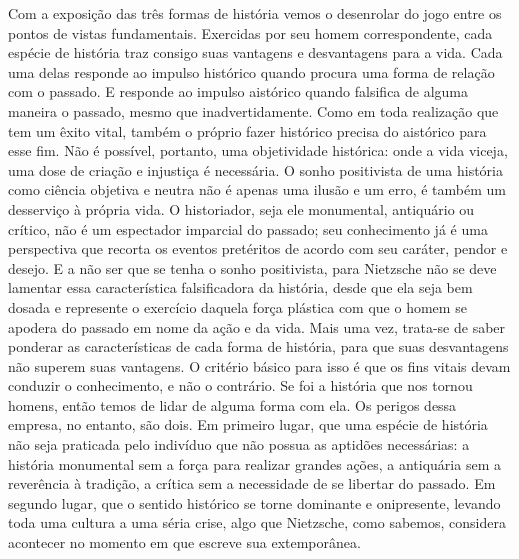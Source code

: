 Com a exposição das três formas de história vemos o desenrolar do jogo
entre os pontos de vistas fundamentais. Exercidas por seu homem
correspondente, cada espécie de história traz consigo suas vantagens e
desvantagens para a vida. Cada uma delas responde ao impulso histórico
quando procura uma forma de relação com o passado. E responde ao impulso
aistórico quando falsifica de alguma maneira o passado, mesmo que
inadvertidamente. Como em toda realização que tem um êxito vital, também
o próprio fazer histórico precisa do aistórico para esse fim. Não é
possível, portanto, uma objetividade histórica: onde a vida viceja, uma
dose de criação e injustiça é necessária. O sonho positivista de uma
história como ciência objetiva e neutra não é apenas uma ilusão e um
erro, é também um desserviço à própria vida. O historiador, seja ele
monumental, antiquário ou crítico, não é um espectador imparcial do
passado; seu conhecimento já é uma perspectiva que recorta os eventos
pretéritos de acordo com seu caráter, pendor e desejo. E a não ser que
se tenha o sonho positivista, para Nietzsche não se deve lamentar essa
característica falsificadora da história, desde que ela seja bem dosada
e represente o exercício daquela força plástica com que o homem se
apodera do passado em nome da ação e da vida. Mais uma vez, trata-se de
saber ponderar as características de cada forma de história, para que
suas desvantagens não superem suas vantagens. O critério básico para
isso é que os fins vitais devam conduzir o conhecimento, e não o
contrário. Se foi a história que nos tornou homens, então temos de lidar
de alguma forma com ela. Os perigos dessa empresa, no entanto, são dois.
Em primeiro lugar, que uma espécie de história não seja praticada pelo
indivíduo que não possua as aptidões necessárias: a história monumental
sem a força para realizar grandes ações, a antiquária sem a reverência à
tradição, a crítica sem a necessidade de se libertar do passado. Em
segundo lugar, que o sentido histórico se torne dominante e onipresente,
levando toda uma cultura a uma séria crise, algo que Nietzsche, como
sabemos, considera acontecer no momento em que escreve sua extemporânea.

